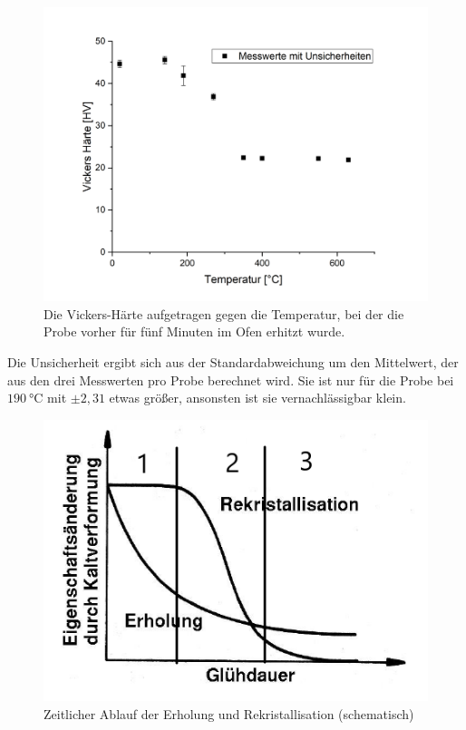 \documentclass[
	a4paper,
	12pt,
	pagesize,
	ngerman
]{scrartcl}
\begin{document}
\begin{figure}[h]
	\centering
	\includegraphics[scale=0.6]{vickers.png}
	\caption{Die Vickers-Härte aufgetragen gegen die Temperatur, bei der die Probe vorher für fünf Minuten im Ofen erhitzt wurde.}
	\label{vickers}
\end{figure}

Die Unsicherheit ergibt sich aus der Standardabweichung um den Mittelwert, der aus den drei Messwerten pro Probe berechnet wird. Sie ist nur für die Probe bei $\SI{190}{\degreeCelsius}$ mit $\pm2,31$ etwas größer, ansonsten ist sie vernachlässigbar klein.

\begin{figure}[h]
	\centering
	\includegraphics[scale=1]{grafik1.png}
	\caption{Zeitlicher Ablauf der Erholung und Rekristallisation (schematisch)}
	\label{grafik}
\end{figure}
\end{document}
